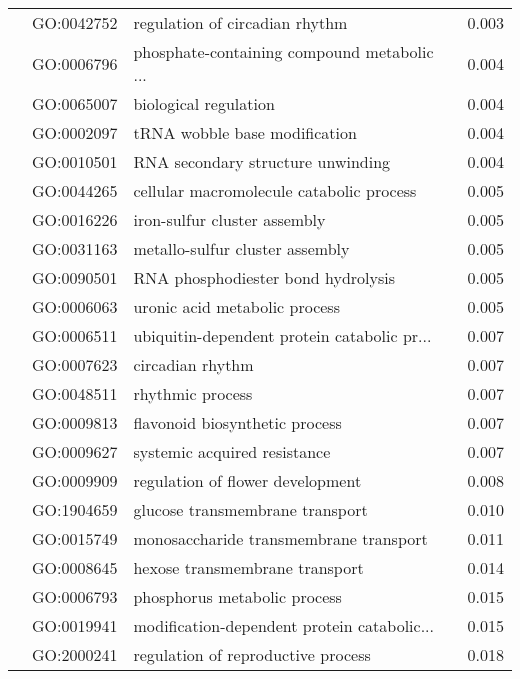 \begin{longtable}{lllr}
   & GO:0042752 &               regulation of circadian rhythm &         0.003 \\
   & GO:0006796 &  phosphate-containing compound metabolic ... &         0.004 \\
   & GO:0065007 &                        biological regulation &         0.004 \\
   & GO:0002097 &                tRNA wobble base modification &         0.004 \\
   & GO:0010501 &            RNA secondary structure unwinding &         0.004 \\
   & GO:0044265 &     cellular macromolecule catabolic process &         0.005 \\
   & GO:0016226 &                 iron-sulfur cluster assembly &         0.005 \\
   & GO:0031163 &              metallo-sulfur cluster assembly &         0.005 \\
   & GO:0090501 &           RNA phosphodiester bond hydrolysis &         0.005 \\
   & GO:0006063 &                uronic acid metabolic process &         0.005 \\
   & GO:0006511 &  ubiquitin-dependent protein catabolic pr... &         0.007 \\
   & GO:0007623 &                             circadian rhythm &         0.007 \\
   & GO:0048511 &                             rhythmic process &         0.007 \\
   & GO:0009813 &               flavonoid biosynthetic process &         0.007 \\
   & GO:0009627 &                 systemic acquired resistance &         0.007 \\
   & GO:0009909 &             regulation of flower development &         0.008 \\
   & GO:1904659 &              glucose transmembrane transport &         0.010 \\
   & GO:0015749 &       monosaccharide transmembrane transport &         0.011 \\
   & GO:0008645 &               hexose transmembrane transport &         0.014 \\
   & GO:0006793 &                 phosphorus metabolic process &         0.015 \\
   & GO:0019941 &  modification-dependent protein catabolic... &         0.015 \\
   & GO:2000241 &           regulation of reproductive process &         0.018 \\

\end{longtable}
